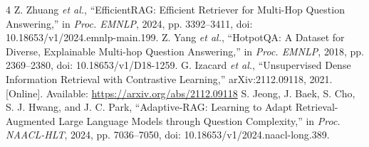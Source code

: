 \documentclass[conference]{IEEEtran}
\begin{document}
\begin{thebibliography}{4}
 Z. Zhuang \emph{et al.}, ``EfficientRAG: Efficient Retriever for Multi-Hop Question Answering,'' in \emph{Proc. EMNLP}, 2024, pp. 3392--3411, doi: 10.18653/v1/2024.emnlp-main.199.
 Z. Yang \emph{et al.}, ``HotpotQA: A Dataset for Diverse, Explainable Multi-hop Question Answering,'' in \emph{Proc. EMNLP}, 2018, pp. 2369--2380, doi: 10.18653/v1/D18-1259.
 G. Izacard \emph{et al.}, ``Unsupervised Dense Information Retrieval with Contrastive Learning,'' arXiv:2112.09118, 2021. [Online]. Available: \url{https://arxiv.org/abs/2112.09118}
 S. Jeong, J. Baek, S. Cho, S. J. Hwang, and J. C. Park, ``Adaptive-RAG: Learning to Adapt Retrieval-Augmented Large Language Models through Question Complexity,'' in \emph{Proc. NAACL-HLT}, 2024, pp. 7036--7050, doi: 10.18653/v1/2024.naacl-long.389.
\end{thebibliography}
\end{document}
